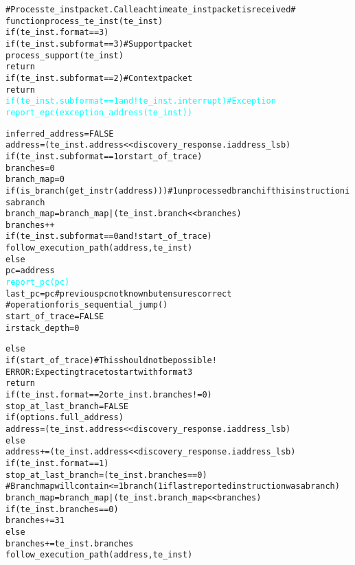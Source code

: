 \begin{alltt}
# Process te_inst packet.  Call each time a te_inst packet is received #
function process_te_inst (te_inst)
  if (te_inst.format == 3)
    if (te_inst.subformat == 3) # Support packet
      process_support(te_inst)
      return
    if (te_inst.subformat == 2) # Context packet
      return
    \textcolor{cyan}{if (te_inst.subformat == 1 and !te_inst.interrupt) # Exception}
      \textcolor{cyan}{report_epc(exception_address(te_inst))}

    inferred_address = FALSE
    address       = (te_inst.address << discovery_response.iaddress_lsb)
    if (te_inst.subformat == 1 or start_of_trace)
      branches    = 0
      branch_map  = 0
    if (is_branch(get_instr(address))) # 1 unprocessed branch if this instruction is a branch
      branch_map = branch_map | (te_inst.branch << branches)
      branches++
    if (te_inst.subformat == 0 and !start_of_trace)
      follow_execution_path(address, te_inst)
    else
      pc           = address
      \textcolor{cyan}{report_pc(pc)}
      last_pc      = pc # previous pc not known but ensures correct
                        #  operation for is_sequential_jump()
    start_of_trace = FALSE
    irstack_depth  = 0

  else
    if (start_of_trace) # This should not be possible!
      ERROR: Expecting trace to start with format 3
      return
    if (te_inst.format == 2 or te_inst.branches != 0)
      stop_at_last_branch = FALSE
      if (options.full_address)
        address  = (te_inst.address << discovery_response.iaddress_lsb)
      else
        address += (te_inst.address << discovery_response.iaddress_lsb)
    if (te_inst.format == 1)
      stop_at_last_branch = (te_inst.branches == 0)
      # Branch map will contain <= 1 branch (1 if last reported instruction was a branch)
      branch_map = branch_map | (te_inst.branch_map << branches)
      if (te_inst.branches == 0)
        branches += 31
      else
        branches += te_inst.branches
    follow_execution_path(address, te_inst)
\end{alltt}

\pagebreak

